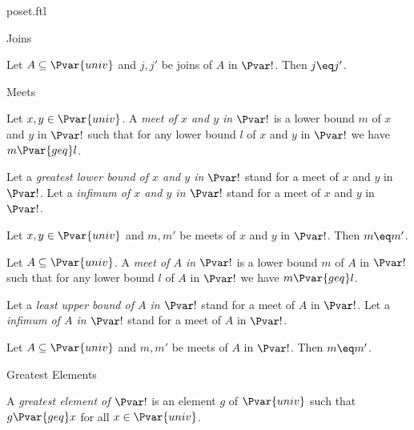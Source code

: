 \documentclass{naproche-library}
\begin{document}
\begin{smodule}[title=Posets]{poset.ftl}
\begin{sfragment}{Joins}
  \begin{proposition}[forthel,id=JoinOfSetIsUniqueThm]
    Let $A \subseteq \Pvar{univ}$ and $j, j'$ be joins of $A$ in $\Pvar!$.
    Then $j\eq j'$.
  \end{proposition}
\end{sfragment}

\begin{sfragment}{Meets}
  \begin{definition}[forthel,id=MeetOfPairDef]
    Let $x, y \in \Pvar{univ}$.
    A \emph{meet of $x$ and $y$ in $\Pvar!$} is a lower bound $m$ of $x$ and $y$ in $\Pvar!$ such that for any lower bound $l$ of $x$ and $y$ in $\Pvar!$ we have $m {\Pvar{geq}} l$.

    Let a \emph{greatest lower bound of $x$ and $y$ in $\Pvar!$} stand for a meet of $x$ and $y$ in $\Pvar!$.
    Let a \emph{infimum of $x$ and $y$ in $\Pvar!$} stand for a meet of $x$ and $y$ in $\Pvar!$.
  \end{definition}

  \begin{proposition}[forthel,id=MeetOfPairIsUniqueThm]
    Let $x, y \in \Pvar{univ}$ and $m, m'$ be meets of $x$ and $y$ in $\Pvar!$.
    Then $m\eq m'$.
  \end{proposition}
      
  \begin{definition}[forthel,id=MeetOfSetDef]
    Let $A \subseteq \Pvar{univ}$.
    A \emph{meet of $A$ in $\Pvar!$} is a lower bound $m$ of $A$ in $\Pvar!$ such that for any lower bound $l$ of $A$ in $\Pvar!$ we have $m {\Pvar{geq}} l$.

    Let a \emph{least upper bound of $A$ in $\Pvar!$} stand for a meet of $A$ in $\Pvar!$.
    Let a \emph{infimum of $A$ in $\Pvar!$} stand for a meet of $A$ in $\Pvar!$.
  \end{definition}

  \begin{proposition}[forthel,id=MeetOfSetIsUniqueThm]
    Let $A \subseteq \Pvar{univ}$ and $m, m'$ be meets of $A$ in $\Pvar!$.
    Then $m\eq m'$.
  \end{proposition}
\end{sfragment}

\begin{sfragment}{Greatest Elements}
  \begin{definition}[forthel,id=GreatestElementDef]
    A \emph{greatest element of $\Pvar!$} is an element $g$ of $\Pvar{univ}$ such that $g {\Pvar{geq}} x$ for all $x \in \Pvar{univ}$.
  \end{definition}


\end{sfragment}
\end{smodule}
\end{document}
